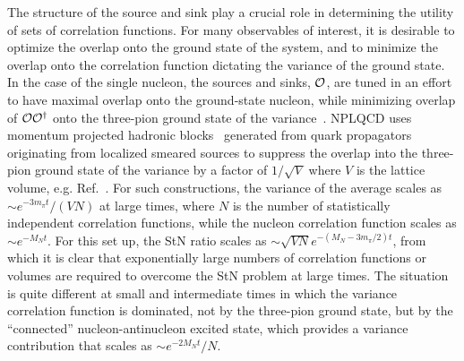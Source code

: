 The structure of the source and sink play a crucial role in determining the utility of sets of correlation functions.
For many observables of interest, it is desirable to optimize the overlap onto the ground state of the system, and to minimize the overlap onto the correlation function dictating the variance of the ground state.
In the case of the single nucleon, the sources and sinks, ${\cal O}$,  
are tuned in an effort to have maximal overlap onto the ground-state nucleon, while minimizing overlap 
of ${\cal O}{\cal O}^\dagger$ onto the three-pion ground state of the variance~\cite{Detmold:2014rfa}.
NPLQCD uses  momentum projected hadronic blocks~\cite{Beane:2006mx} generated from quark propagators 
originating from localized smeared sources to suppress the overlap into the three-pion ground state of the variance by a factor of 
$1/\sqrt{V}$ where $V$ is the lattice volume, e.g. Ref.~\cite{Beane:2009kya}.  
For such constructions, the variance of the average scales as
$\sim  e^{- 3 m_\pi t}/(V N)$ at large times, 
where $N$ is the number of statistically independent correlation functions,
while the nucleon correlation function scales as $\sim e^{- M_N t}$.
For this set up, the StN ratio scales as $\sim \sqrt{V N} e^{ - (M_N - 3 m_\pi/2) t}$, from which it is clear that 
exponentially large numbers of correlation functions or volumes are required to overcome the StN problem at large times.
The situation is quite different at small and intermediate times in which the variance correlation function is dominated, not by the three-pion ground state, but by the ``connected'' nucleon-antinucleon excited state, which provides a variance contribution that scales as $\sim  e^{- 2 M_N t}/N$.  

